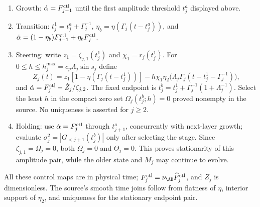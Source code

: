\begin{enumerate}
\item Growth: $\dot\alpha=F_{j-1}^{\rm ctl}$ until the first amplitude threshold $t_j^a$ displayed above.
\item Transition: $t_j^1=t_j^a+\Gamma_j^{-1}$, $\eta_b=\eta(\Gamma_j(t-t_j^a))$, and $\dot\alpha=(1-\eta_b)F_{j-1}^{\rm ctl}+\eta_b F_j^{\rm ctl}$.
\item Steering: write $z_1=\zeta_{j,1}(t_j^1)$ and $\chi_1=r_j(t_j^1)$. For $0\le h\le h_j^{\max}=c_p\Lambda_j\sin s_j$ define
\[
 Z_j(t)=z_1[1-\eta(\Gamma_j(t-t_j^1))]
 -h\chi_1\eta_2\bigl(\Lambda_j\Gamma_j(t-t_j^1-\Gamma_j^{-1})\bigr),
\]
and $\dot\alpha=F_j^{\rm ctl}-\dot Z_j/\zeta_{j,2}$. The fixed endpoint is $t_j^b=t_j^1+\Gamma_j^{-1}(1+\Lambda_j^{-1})$. Select the least $h$ in the compact zero set $\Omega_j(t_j^b;h)=0$ proved nonempty in the source. No uniqueness is asserted for $j\ge2$.
\item Holding: use $\dot\alpha=F_j^{\rm ctl}$ through $t_{j+1}^a$, concurrently with next-layer growth; evaluate $\sigma_j^2=|G_{<j+1}(t_j^b)|$ only after selecting the stage. Since $\zeta_{j,1}=\Omega_j=0$, both $\dot\Omega_j=0$ and $\dot\Theta_j=0$. This proves stationarity of this amplitude pair, while the older state and $M_j$ may continue to evolve.
\end{enumerate}
All these control maps are in physical time; $F_j^{\rm ctl}=\nu_{\AB}\widehat F_j^{\rm ctl}$, and $Z_j$ is dimensionless. The source's smooth time joins follow from flatness of $\eta$, interior support of $\eta_2$, and uniqueness for the stationary endpoint pair.

